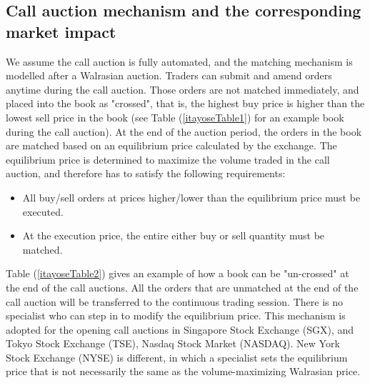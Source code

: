 \documentclass{article}
\begin{document}
\subsection{Call auction mechanism and the corresponding market impact}\label{subSecTheoreticalFrameworkCallAuction}

We assume the call auction is fully automated, and the matching mechanism is modelled after a Walrasian auction. Traders can submit and amend orders anytime during the call auction. Those orders are not matched immediately, and placed into the book as "crossed", that is, the highest buy price is higher than the lowest sell price in the book (see Table (\ref{itayoseTable1}) for an example book during the call auction). At the end of the auction period, the orders in the book are matched based on an equilibrium price calculated by the exchange. The equilibrium price is determined to maximize the volume traded in the call auction, and therefore has to satisfy the following requirements:

\begin{itemize}
  \item All buy/sell orders at prices higher/lower than the equilibrium price must be executed.
  \item At the execution price, the entire either buy or sell quantity must be matched.
\end{itemize}

Table (\ref{itayoseTable2}) gives an example of how a book can be "un-crossed" at the end of the call auctions. All the orders that are unmatched at the end of the call auction will be transferred to the continuous trading session. There is no specialist who can step in to modify the equilibrium price. This mechanism is adopted for the opening call auctions in Singapore Stock Exchange (SGX), and Tokyo Stock Exchange (TSE), Nasdaq Stock Market (NASDAQ). New York Stock Exchange (NYSE) is different, in which a specialist sets the equilibrium price that is not necessarily the same as the volume-maximizing Walrasian price.
\end{document}
